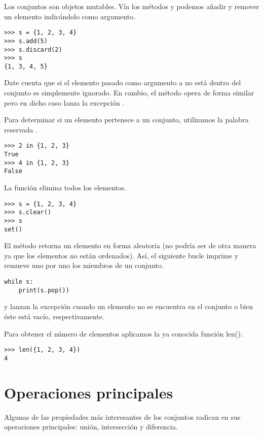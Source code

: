 Los conjuntos son objetos mutables. Vía los métodos  y  podemos añadir y remover un elemento indicándolo como argumento.

\begin{Verbatim}[frame=single]
>>> s = {1, 2, 3, 4}
>>> s.add(5)
>>> s.discard(2)
>>> s
{1, 3, 4, 5}
\end{Verbatim}

Date cuenta que si el elemento pasado como argumento a  no está dentro del conjunto es simplemente ignorado. En cambio, el método  opera de forma similar pero en dicho caso lanza la excepción .

Para determinar si un elemento pertenece a un conjunto, utilizamos la palabra reservada .

\begin{Verbatim}[frame=single]
>>> 2 in {1, 2, 3}
True
>>> 4 in {1, 2, 3}
False
\end{Verbatim}

La función  elimina todos los elementos.

\begin{Verbatim}[frame=single]
>>> s = {1, 2, 3, 4}
>>> s.clear()
>>> s
set()
\end{Verbatim}


El método  retorna un elemento en forma aleatoria (no podría ser de otra manera ya que los elementos no están ordenados). Así, el siguiente bucle imprime y remueve uno por uno los miembros de un conjunto.

\begin{Verbatim}[frame=single]
while s:
    print(s.pop())
\end{Verbatim}
 y  lanzan la excepción  cuando un elemento no se encuentra en el conjunto o bien éste está vacío, respectivamente.

Para obtener el número de elementos aplicamos la ya conocida función len():
\begin{Verbatim}[frame=single]
>>> len({1, 2, 3, 4})
4
\end{Verbatim}


\section{Operaciones principales}
Algunas de las propiedades más interesantes de los conjuntos radican en sus operaciones principales: unión, intersección y diferencia.

